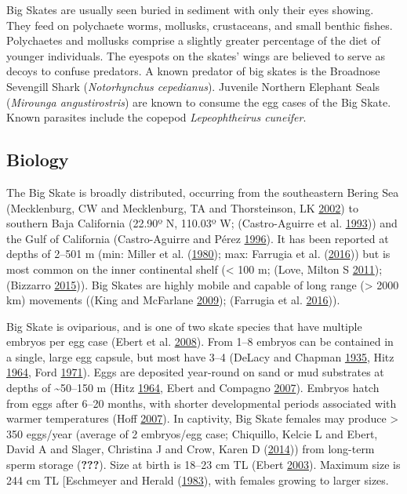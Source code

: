 \documentclass[12pt,]{article}
\begin{document}
Big Skates are usually seen buried in sediment with only their eyes
showing. They feed on polychaete worms, mollusks, crustaceans, and small
benthic fishes. Polychaetes and mollusks comprise a slightly greater
percentage of the diet of younger individuals. The eyespots on the
skates' wings are believed to serve as decoys to confuse predators. A
known predator of big skates is the Broadnose Sevengill Shark
(\emph{Notorhynchus cepedianus}). Juvenile Northern Elephant Seals
(\emph{Mirounga angustirostris}) are known to consume the egg cases of
the Big Skate. Known parasites include the copepod \emph{Lepeophtheirus
cuneifer}.

\hypertarget{biology}{%
\subsection{Biology}\label{biology}}

The Big Skate is broadly distributed, occurring from the southeastern
Bering Sea (Mecklenburg, CW and Mecklenburg, TA and Thorsteinson, LK
\protect\hyperlink{ref-Mecklenburg2002}{2002}) to southern Baja
California (22.90º N, 110.03º W; (Castro-Aguirre et al.
\protect\hyperlink{ref-Castro1993}{1993})) and the Gulf of California
(Castro-Aguirre and Pérez \protect\hyperlink{ref-Castro1996}{1996}). It
has been reported at depths of 2--501 m (min: Miller et al.
(\protect\hyperlink{ref-Miller1980}{1980}); max: Farrugia et al.
(\protect\hyperlink{ref-Farrugia2016}{2016})) but is most common on the
inner continental shelf (\textless{} 100 m; (Love, Milton S
\protect\hyperlink{ref-Love2011}{2011}); (Bizzarro
\protect\hyperlink{ref-Bizzarro2015}{2015})). Big Skates are highly
mobile and capable of long range (\textgreater{} 2000 km) movements
((King and McFarlane \protect\hyperlink{ref-KingandMcF2009}{2009});
(Farrugia et al. \protect\hyperlink{ref-Farrugia2016}{2016})).

Big Skate is oviparious, and is one of two skate species that have
multiple embryos per egg case (Ebert et al.
\protect\hyperlink{ref-Ebert2008}{2008}). From 1--8 embryos can be
contained in a single, large egg capsule, but most have 3--4 (DeLacy and
Chapman \protect\hyperlink{ref-DeLacy1935}{1935}, Hitz
\protect\hyperlink{ref-Hitz1964}{1964}, Ford
\protect\hyperlink{ref-Ford1971}{1971}). Eggs are deposited year-round
on sand or mud substrates at depths of \textasciitilde{}50--150 m (Hitz
\protect\hyperlink{ref-Hitz1964}{1964}, Ebert and Compagno
\protect\hyperlink{ref-Ebert2007}{2007}). Embryos hatch from eggs after
6--20 months, with shorter developmental periods associated with warmer
temperatures (Hoff \protect\hyperlink{ref-Hoff2007}{2007}). In
captivity, Big Skate females may produce \textgreater{} 350 eggs/year
(average of 2 embryos/egg case; Chiquillo, Kelcie L and Ebert, David A
and Slager, Christina J and Crow, Karen D
(\protect\hyperlink{ref-Chiquillo2014}{2014})) from long-term sperm
storage ({\textbf{???}}). Size at birth is 18--23 cm TL (Ebert
\protect\hyperlink{ref-Ebert2003}{2003}). Maximum size is 244 cm TL
{[}Eschmeyer and Herald (\protect\hyperlink{ref-Eschmeyer1983}{1983}),
with females growing to larger sizes.
\end{document}
